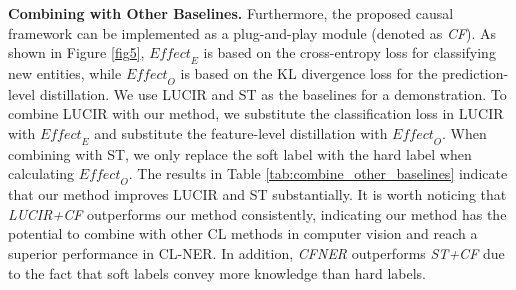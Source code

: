 \documentclass[11pt]{article}
\begin{document}
\begin{table}[htbp]
  \centering
  \caption{Combining our methods with other baselines on three datasets in the setting FG-1-PG-1. \textit{Mi-F1}: micro-F1; \textit{Ma-F1}: macro-F1. \textit{CF} represents applying causal effects.}
  \label{tab:combine_other_baselines}\end{table}

\noindent\textbf{Combining with Other Baselines.}\quad
Furthermore, the proposed causal framework can be implemented as a plug-and-play module (denoted as \textit{CF}).
As shown in Figure \ref{fig5}, $\textit{Effect}_E$ is based on the cross-entropy loss for classifying new entities, while $\textit{Effect}_O$ is based on the KL divergence loss for the prediction-level distillation.
We use LUCIR and ST as the baselines for a demonstration.
To combine LUCIR with our method, we substitute the classification loss in LUCIR with $\textit{Effect}_E$ and substitute the feature-level distillation with $\textit{Effect}_O$.
When combining with ST, we only replace the soft label with the hard label when calculating $\textit{Effect}_O$.
The results in Table \ref{tab:combine_other_baselines} indicate that our method improves LUCIR and ST substantially.
It is worth noticing that \textit{LUCIR+CF} outperforms our method consistently, indicating our method has the potential to combine with other CL methods in computer vision and reach a superior performance in CL-NER. 
In addition, \textit{CFNER} outperforms \textit{ST+CF} due to the fact that soft labels convey more knowledge than hard labels.
\end{document}
